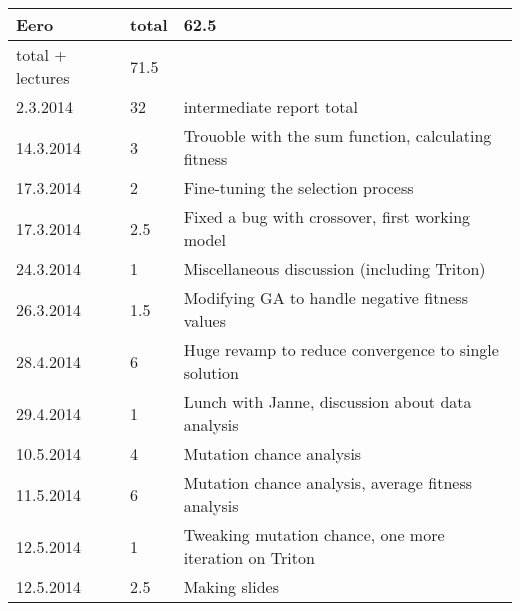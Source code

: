\documentclass[twoside]{article}
\begin{document}
\begin{tabular}{|l|l|l|}
\hline
	\textbf{Eero} & \textbf{total} & \textbf{62.5} \\ \hline
	total + lectures & 71.5 & \  \\ \hline
	2.3.2014 & 32 & intermediate report total \\ \hline
	14.3.2014 & 3 & Trouoble with the sum function, calculating fitness \\ \hline
	17.3.2014 & 2 & Fine-tuning the selection process \\ \hline
	17.3.2014 & 2.5 & Fixed a bug with crossover, first working model \\ \hline
	24.3.2014 & 1 & Miscellaneous discussion (including Triton) \\ \hline
	26.3.2014 & 1.5 & Modifying GA to handle negative fitness values \\ \hline
	28.4.2014 & 6 & Huge revamp to reduce convergence to single solution \\ \hline
	29.4.2014 & 1 & Lunch with Janne, discussion about data analysis \\ \hline
	10.5.2014 & 4 & Mutation chance analysis \\ \hline
	11.5.2014 & 6 & Mutation chance analysis, average fitness analysis \\ \hline
	12.5.2014 & 1 & Tweaking mutation chance, one more iteration on Triton \\ \hline
	12.5.2014 & 2.5 & Making slides \\ \hline
\end{tabular}
\end{document}
